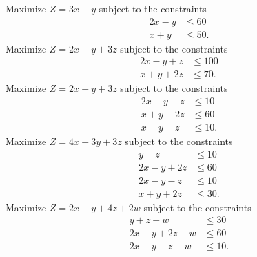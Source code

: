 
\begin{Exercise}[
name={},
title={}, 
difficulty=0,
origin={\cite{YL}}]

\Question Maximize $Z=3x+y$ subject to the constraints
\begin{align*}
2x-y &\leq 60\\
x+y&\leq50.
\end{align*}
\Question Maximize $Z=2x+y+3z$ subject to the constraints 
\begin{align*}
2x-y+z&\leq100\\
x+y+2z&\leq70.
\end{align*}
\Question Maximize $Z=2x+y+3z$ subject to the constraints 
\begin{align*}
2x-y-z&\leq10\\ 
x+y+2z&\leq60\\
x-y-z&\leq10.
\end{align*}
\Question Maximize $Z=4x+3y+3z$ subject to the constraints 
\begin{align*}
y-z&\leq10\\ 
2x-y+2z&\leq60\\ 
2x-y-z&\leq10\\ 
x+y+2z&\leq30.
\end{align*}
\Question Maximize $Z=2x-y+4z+2w$ subject to the constraints 
\begin{align*}
y+z+w&\leq30\\
2x-y+2z-w&\leq60\\ 
2x-y-z-w&\leq10.
\end{align*}
\end{Exercise}

